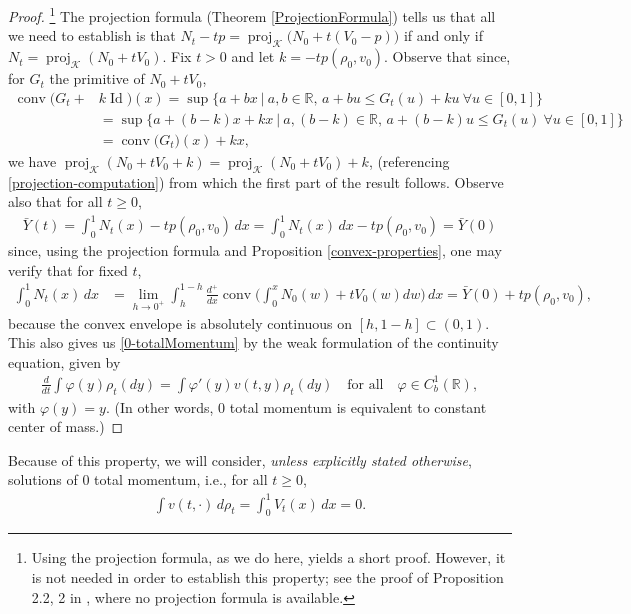 \documentclass[10pt,a4paper]{amsart}
\numberwithin{equation}{section}
\DeclareMathOperator{\proj}{proj}
\DeclareMathOperator{\Id}{Id}
\DeclareMathOperator{\conv}{conv}
\begin{document}
    \begin{proof} \!\!\!\! \footnote{Using the projection formula, as we do here, yields a short proof. However, it is not needed in order to establish this property; see the proof of Proposition 2.2, 2 in \cite{Repulsive-Paper}, where no projection formula is available.}
        The projection formula (Theorem \ref{ProjectionFormula}) tells us that all we need to establish is that $N_t-tp=\proj_{\mathcal{K}}\big(N_0+t(V_0-p)\big)$ if and only if $N_t=\proj_{\mathcal{K}}(N_0+tV_0)$. Fix $t>0$ and let $k=-tp(\rho_0,v_0)$. Observe that since, for $G_t$ the primitive of $N_0+tV_0$, 
        \begin{align*}
            \conv\big(G_t+&k\Id\big)(x)=\sup\big\{a+bx \ \big| \ a,b\in\mathbb{R}\text{, }a+bu\leq G_t(u)+ku \ \forall u\in[0,1]\big\}
            \\
            &=\sup\big\{a+(b-k)x+kx \ \big| \ a,(b-k)\in\mathbb{R}\text{, }a+(b-k)u\leq G_t(u) \ \forall u\in[0,1]\big\}
            \\
            &=\conv\big(G_t\big)(x)+kx, 
        \end{align*}
        we have $\proj_{\mathcal{K}}(N_0+tV_0+k)=\proj_{\mathcal{K}}(N_0+tV_0)+k$, (referencing \eqref{projection-computation}) from which the first part of the result follows. Observe also that for all $t\geq0$, 
        \begin{align*}
            \bar{Y}(t)=\int_0^1 N_t(x)-tp(\rho_0,v_0) \, dx=\int_0^1 N_t(x) \, dx-tp(\rho_0,v_0)=\bar{Y}(0) 
        \end{align*}
        since, using the projection formula and Proposition \ref{convex-properties}, one may verify that for fixed $t$,
        \begin{align*}
            \int_0^1 N_t(x) \, dx&=\lim_{h\to0^+}\int_h^{1-h}\frac{d^+}{dx}\conv\Big(\int_0^x N_0(w)+tV_0(w)dw\Big) \, dx=\bar{Y}(0)+tp(\rho_0,v_0),
        \end{align*}
        because the convex envelope is absolutely continuous on $[h,1-h]
        \subset(0,1)$. This also gives us \eqref{0-totalMomentum} by the weak formulation of the continuity equation, given by 
        \begin{align*}
            \frac{d}{dt}\int\varphi(y)\rho_t(dy)=\int\varphi'(y)v(t,y)\rho_t(dy) \quad \text{for all} \quad \varphi\in C_b^1(\mathbb{R}), 
        \end{align*}
        with $\varphi(y)=y$. (In other words, $0$ total momentum is equivalent to constant center of mass.)
    \end{proof}
    Because of this property, we will consider, \textit{unless explicitly stated otherwise}, solutions of $0$ total momentum, i.e., for all $t\geq0$,
    \begin{align}\label{0-total-momentum}
        \int v(t,\cdot) \, d\rho_t=\int_0^1 V_t(x) \, dx=0.
    \end{align}
\end{document}
